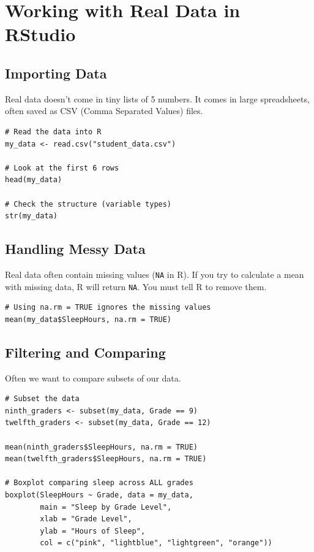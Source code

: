 \documentclass[11pt,openany]{book}
\begin{document}
\chapter{Working with Real Data in RStudio}

\section{Importing Data}
Real data doesn't come in tiny lists of 5 numbers. It comes in large spreadsheets, often saved as CSV (Comma Separated Values) files.

\begin{lstlisting}[style=rcode]
# Read the data into R
my_data <- read.csv("student_data.csv")

# Look at the first 6 rows
head(my_data)

# Check the structure (variable types)
str(my_data)
\end{lstlisting}

\section{Handling Messy Data}
Real data often contain missing values (\texttt{NA} in R). If you try to calculate a mean with missing data, R will return \texttt{NA}. You must tell R to remove them.

\begin{lstlisting}[style=rcode]
# Using na.rm = TRUE ignores the missing values
mean(my_data$SleepHours, na.rm = TRUE)
\end{lstlisting}

\section{Filtering and Comparing}
Often we want to compare subsets of our data.
\begin{lstlisting}[style=rcode]
# Subset the data
ninth_graders <- subset(my_data, Grade == 9)
twelfth_graders <- subset(my_data, Grade == 12)

mean(ninth_graders$SleepHours, na.rm = TRUE)
mean(twelfth_graders$SleepHours, na.rm = TRUE)

# Boxplot comparing sleep across ALL grades
boxplot(SleepHours ~ Grade, data = my_data,
        main = "Sleep by Grade Level",
        xlab = "Grade Level",
        ylab = "Hours of Sleep",
        col = c("pink", "lightblue", "lightgreen", "orange"))
\end{lstlisting}
\end{document}

